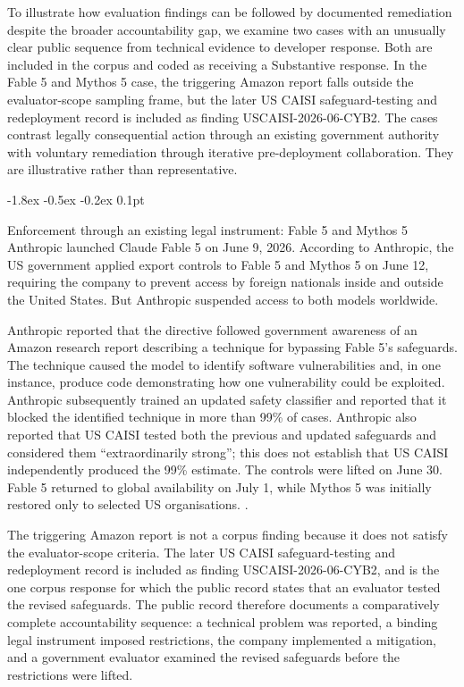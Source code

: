 \documentclass{article}
\makeatletter
\renewcommand{\subsection}{%
  \@startsection{subsection}{2}{\z@}%
                {-1.8ex \@plus -0.5ex \@minus -0.2ex}%
                {0.1pt}%
                {\normalsize\bf\raggedright}%
}
\makeatother
\begin{document}
To illustrate how evaluation findings can be followed by documented remediation despite the broader accountability gap, we examine two cases with an unusually clear public sequence from technical evidence to developer response. Both are included in the corpus and coded as receiving a Substantive response. In the Fable 5 and Mythos 5 case, the triggering Amazon report falls outside the evaluator-scope sampling frame, but the later US CAISI safeguard-testing and redeployment record is included as finding USCAISI-2026-06-CYB2. The cases contrast legally consequential action through an existing government authority with voluntary remediation through iterative pre-deployment collaboration. They are illustrative rather than representative.

\subsection{Enforcement through an existing legal instrument: Fable 5 and Mythos 5}\label{sec:fable}
Anthropic launched Claude Fable 5 on June 9, 2026. According to Anthropic, the US government applied export controls to Fable 5 and Mythos 5 on June 12, requiring the company to prevent access by foreign nationals inside and outside the United States. But Anthropic suspended access to both models worldwide.

Anthropic reported that the directive followed government awareness of an Amazon research report describing a technique for bypassing Fable 5's safeguards. The technique caused the model to identify software vulnerabilities and, in one instance, produce code demonstrating how one vulnerability could be exploited. Anthropic subsequently trained an updated safety classifier and reported that it blocked the identified technique in more than 99\% of cases. Anthropic also reported that US CAISI tested both the previous and updated safeguards and considered them ``extraordinarily strong''; this does not establish that US CAISI independently produced the 99\% estimate. The controls were lifted on June 30. Fable 5 returned to global availability on July 1, while Mythos 5 was initially restored only to selected US organisations. \citep{anthropic2026fable}.

The triggering Amazon report is not a corpus finding because it does not satisfy the evaluator-scope criteria. The later US CAISI safeguard-testing and redeployment record is included as finding USCAISI-2026-06-CYB2, and is the one corpus response for which the public record states that an evaluator tested the revised safeguards. The public record therefore documents a comparatively complete accountability sequence: a technical problem was reported, a binding legal instrument imposed restrictions, the company implemented a mitigation, and a government evaluator examined the revised safeguards before the restrictions were lifted.
\end{document}
